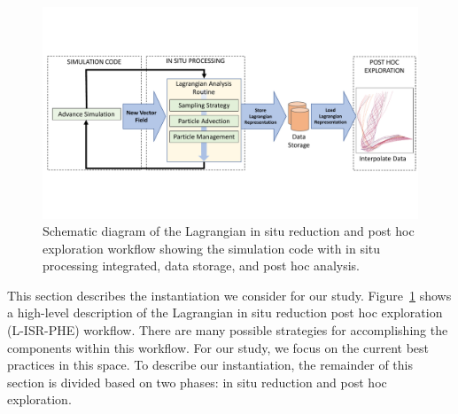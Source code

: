 \begin{figure}[!t]
\centering
\includegraphics[width=0.9\linewidth,trim={0cm 4.3cm 0cm 4.3cm}, clip ]{Images/Schematic.pdf}
\vspace{-2mm}
\caption{Schematic diagram of the Lagrangian in situ reduction and post hoc exploration workflow showing the simulation code with in situ processing integrated, data storage, and post hoc analysis.}
\vspace{-5mm}
\label{fig:schematic}
\end{figure}

%

This section describes the instantiation we consider for our study.
%
Figure~\ref{fig:schematic} shows a high-level description of the Lagrangian in situ reduction post hoc exploration (L-ISR-PHE) workflow. 
%
There are many possible strategies for accomplishing the components within this workflow.
%
For our study, we focus on the current best practices in this space.
%
To describe our instantiation, the remainder of this section is divided based on two phases: in situ reduction and post hoc exploration. 
%
